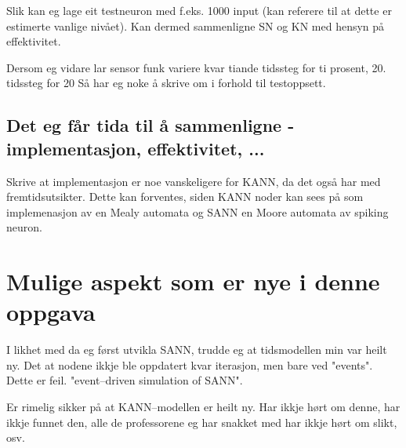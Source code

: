 Slik kan eg lage eit testneuron med f.eks. 1000 input (kan referere til at dette er estimerte vanlige nivået).
Kan dermed sammenligne SN og KN med hensyn på effektivitet.

Dersom eg vidare lar sensor funk variere kvar tiande tidssteg for ti prosent, 20. tidssteg for 20 %
Så har eg noke å skrive om i forhold til testoppsett.














	\subsection{ Det eg får tida til å sammenligne - implementasjon, effektivitet, ...}
	Skrive at implementasjon er noe vanskeligere for KANN, da det også har med fremtidsutsikter. Dette kan forventes, siden KANN noder kan sees på som implemenasjon av en Mealy automata og SANN en Moore automata av spiking neuron.

\section{ Mulige aspekt som er nye i denne oppgava }
	I likhet med da eg først utvikla SANN, trudde eg at tidsmodellen min var heilt ny. Det at nodene ikkje ble oppdatert kvar iterasjon, men bare ved "events". Dette er feil. "event--driven simulation of SANN".
	
	Er rimelig sikker på at KANN--modellen er heilt ny. Har ikkje hørt om denne, har ikkje funnet den, alle de professorene eg har snakket med har ikkje hørt om slikt, osv.
	

